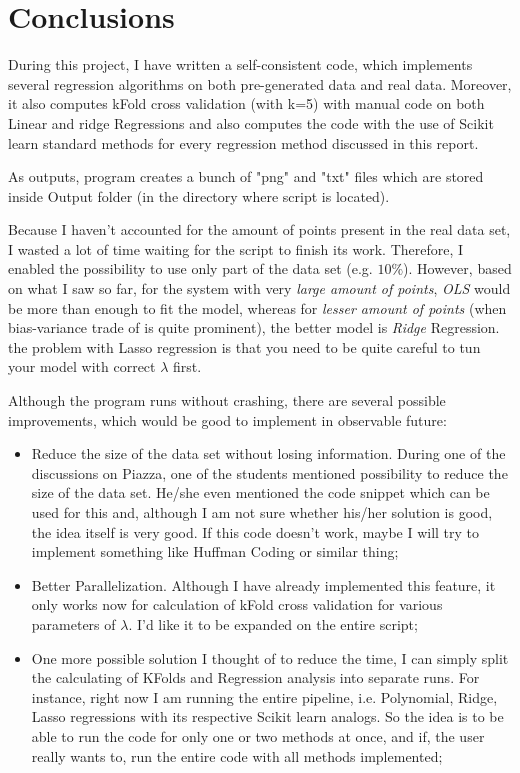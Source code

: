 \section{Conclusions}
\label{sec:conclusions}


During this project, I have written a self-consistent code, which implements several regression algorithms on both pre-generated data and real data. Moreover, it also computes kFold cross validation (with k=5) with manual code on both Linear and ridge Regressions and also computes the code with the use of Scikit learn standard methods for every regression method discussed in this report.

As outputs, program creates a bunch of "png" and "txt" files which are stored inside Output folder (in the directory where script is located). 

Because I haven't accounted for the amount of points present in the real data set, I wasted a lot of time waiting for the script to finish its work. Therefore, I enabled the possibility to use only part of the data set (e.g. $10\%$). However, based on what I saw so far, for the system with very \textit{large amount of points}, \textit{OLS} would be more than enough to fit the model, whereas for \textit{lesser amount of points} (when bias-variance trade of is quite prominent), the better model is \textit{Ridge} Regression. the problem with Lasso regression is that you need to be quite careful to tun your model with correct $\lambda$ first.

Although the program runs without crashing, there are several possible improvements, which would be good to implement in observable future:
\begin{itemize}
    \item Reduce the size of the data set without losing  information. During one of the discussions on Piazza, one of the students mentioned possibility to reduce the size of the data set. He/she even mentioned the code snippet which can be used for this and, although I am not sure whether his/her solution is good, the idea itself is very good. If this code doesn't work, maybe I will try to implement something like Huffman Coding or similar thing;
    \item Better Parallelization. Although I have already implemented this feature, it only works now for calculation of kFold cross validation for various parameters of $\lambda$. I'd like it to be expanded on the entire script;
    \item One more possible solution I thought of to reduce the time, I can simply split the calculating of KFolds and Regression analysis into separate runs. For instance, right now I am running the entire pipeline, i.e. Polynomial, Ridge, Lasso regressions with its respective Scikit learn analogs. So the idea is to be able to run the code for only one or two methods at once, and if, the user really wants to, run the entire code with all methods implemented;
\end{itemize}